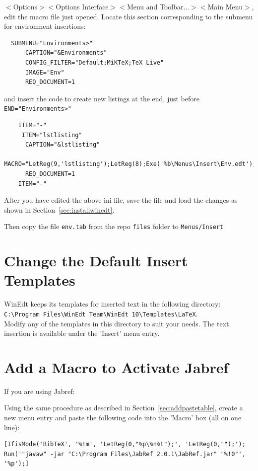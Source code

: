 $<$Options$>$$<$Options Interface$>$$<$Menu and Toolbar...$>$$<$Main Menu$>$, edit the macro file just opened. Locate this section corresponding to the submenu for environment insertions:

\begin{lstlisting}
  SUBMENU="Environments>"
      CAPTION="&Environments"
      CONFIG_FILTER="Default;MiKTeX;TeX Live"
      IMAGE="Env"
      REQ_DOCUMENT=1
\end{lstlisting}

and insert the code to create new listings at the end, just before   \verb+END="Environments>"+

\begin{lstlisting}
    ITEM="-"
     ITEM="lstlisting"
      CAPTION="&lstlisting"
      MACRO="LetReg(9,'lstlisting');LetReg(8);Exe('%b\Menus\Insert\Env.edt');"
      REQ_DOCUMENT=1
    ITEM="-"
\end{lstlisting}

After you have edited the above ini file, save the file and load the changes as shown in Section~\ref{sec:installwinedt}.

Then copy the file \verb+env.tab+  from the repo \lstinline{files} folder to
\lstinline{Menus/Insert}

\section{Change the Default Insert Templates}

WinEdt keeps its templates for inserted text in the following directory:\\
\verb+C:\Program Files\WinEdt Team\WinEdt 10\Templates\LaTeX+.\\
Modify any of the templates in this directory to suit your needs.  The text insertion is available under the 'Insert' menu entry.


\section{Add a Macro to Activate Jabref}

If you are using Jabref:

Using the same procedure as described in Section~\ref{sec:addpastetable}, create a new menu entry and paste the following code into the 'Macro' box (all on one line):

{\footnotesize
\begin{verbatim}
[IfisMode('BibTeX', '%!m', 'LetReg(0,"%p\%n%t");', 'LetReg(0,"");');
Run('"javaw" -jar "C:\Program Files\JabRef 2.0.1\JabRef.jar" "%!0"', '%p');]
\end{verbatim}
}

